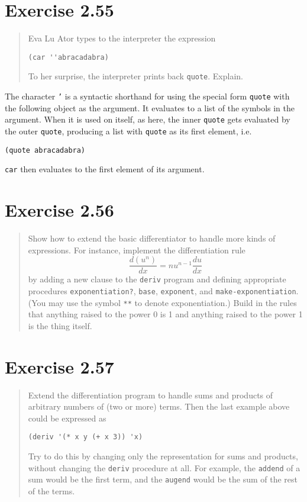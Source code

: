 \documentclass{article}
\begin{document}
\section{Exercise 2.55}
\begin{quote}
    Eva Lu Ator types to the interpreter the expression

    \begin{lstlisting}
(car ''abracadabra)
    \end{lstlisting}

    To her surprise, the interpreter prints back \texttt{quote}. Explain.
\end{quote}

The character \texttt{'} is a syntactic shorthand for using the special form
\texttt{quote} with the following object as the argument. It evaluates to a
list of the symbols in the argument. When it is used on itself, as here, the
inner \texttt{quote} gets evaluated by the outer \texttt{quote}, producing a
list with \texttt{quote} as its first element, i.e.
\begin{lstlisting}
(quote abracadabra)
\end{lstlisting}
\texttt{car} then evaluates to the first element of its argument.

\section{Exercise 2.56}
\begin{quote}
    Show how to extend the basic differentiator to handle more kinds of
    expressions. For instance, implement the differentiation rule
    $$\frac{d(u^n)}{dx} = nu^{n-1}\frac{du}{dx}$$
    by adding a new clause to the \texttt{deriv} program and defining
    appropriate procedures \texttt{exponentiation?}, \texttt{base},
    \texttt{exponent}, and \texttt{make-exponentiation}. (You may use the
    symbol \texttt{**} to denote exponentiation.) Build in the rules that
    anything raised to the power 0 is 1 and anything raised to the power 1 is
    the thing itself.
\end{quote}




\section{Exercise 2.57}
\begin{quote}
    Extend the differentiation program to handle sums and products of arbitrary
    numbers of (two or more) terms. Then the last example above could be
    expressed as
    \begin{lstlisting}
(deriv '(* x y (+ x 3)) 'x)
    \end{lstlisting}
    Try to do this by changing only the representation for sums and products,
    without changing the \texttt{deriv} procedure at all. For example, the
    \texttt{addend} of a sum would be the first term, and the \texttt{augend}
    would be the sum of the rest of the terms.
\end{quote}
\end{document}
